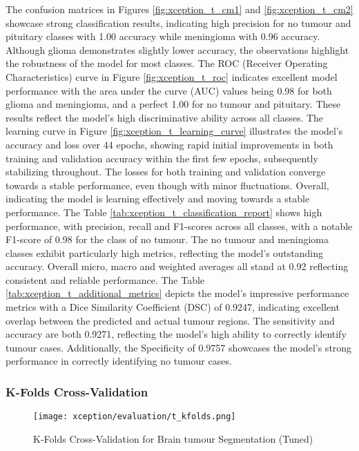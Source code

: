 The confusion matrices in Figures \ref{fig:xception_t_cm1} and \ref{fig:xception_t_cm2} showcase strong classification results, indicating high precision for no tumour and pituitary classes with 1.00 accuracy while meningioma with 0.96 accuracy. Although glioma demonstrates slightly lower accuracy, the observations highlight the robustness of the model for most classes. 
The ROC (Receiver Operating Characteristics) curve in Figure \ref{fig:xception_t_roc} indicates excellent model performance with the area under the curve (AUC) values being 0.98 for both glioma and meningioma, and a perfect 1.00 for no tumour and pituitary. These results reflect the model's high discriminative ability across all classes.
The learning curve in Figure \ref{fig:xception_t_learning_curve} illustrates the model's accuracy and loss over 44 epochs, showing rapid initial improvements in both training and validation accuracy within the first few epochs, subsequently stabilizing throughout. The losses for both training and validation converge towards a stable performance, even though with minor fluctuations. Overall, indicating the model is learning effectively and moving towards a stable performance. 
The Table \ref{tab:xception_t_classification_report} shows high performance, with precision, recall and F1-scores across all classes, with a notable F1-score of 0.98 for the class of no tumour. The no tumour and meningioma classes exhibit particularly high metrics, reflecting the model's outstanding accuracy. Overall micro, macro and weighted averages all stand at 0.92 reflecting consistent and reliable performance. 
The Table \ref{tab:xception_t_additional_metrics} depicts the model's impressive performance metrics with a Dice Similarity Coefficient (DSC) of 0.9247, indicating excellent overlap between the predicted and actual tumour regions. The sensitivity and accuracy are both 0.9271, reflecting the model's high ability to correctly identify tumour cases. Additionally, the Specificity of 0.9757 showcases the model's strong performance in correctly identifying no tumour cases.


\subsubsection{K-Folds Cross-Validation}

\begin{figure}[H]
  \begin{center}
    \texttt{[image: xception/evaluation/t\_kfolds.png]}
  \end{center}
  \caption{K-Folds Cross-Validation for Brain tumour Segmentation (Tuned)}\label{f:xception_kfolds}
\end{figure}

